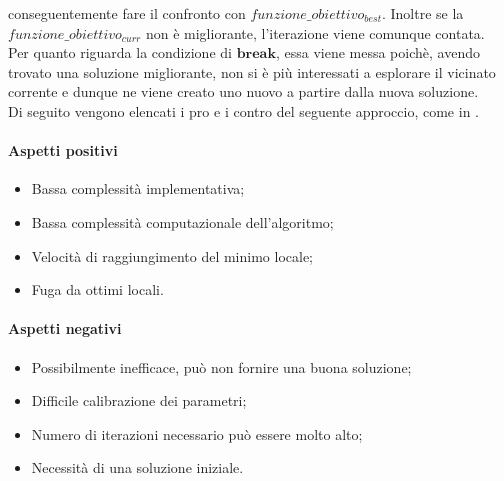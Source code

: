 conseguentemente fare il confronto con {$funzione\_obiettivo_{best}$}. Inoltre se la {$funzione\_obiettivo_{curr}$} non è migliorante, l'iterazione
viene comunque contata.\\
Per quanto riguarda la condizione di {$\textbf{break}$}, essa viene messa poichè, avendo trovato una soluzione migliorante, non si è più interessati a
esplorare il vicinato corrente e dunque ne viene creato uno nuovo a partire dalla nuova soluzione.\\
Di seguito vengono elencati i pro e i contro del seguente approccio, come in \cite{site:paper-lo-go} \cite{site:articolo-tabu-search}.\\
\noindent \paragraph{Aspetti positivi}
\begin{itemize}
    \item Bassa complessità implementativa;
    \item Bassa complessità computazionale dell'algoritmo;
    \item Velocità di raggiungimento del minimo locale;
    \item Fuga da ottimi locali.
\end{itemize}

\noindent \paragraph{Aspetti negativi}
\begin{itemize}
    \item Possibilmente inefficace, può non fornire una buona soluzione;
    \item Difficile calibrazione dei parametri;
    \item Numero di iterazioni necessario può essere molto alto;
    \item Necessità di una soluzione iniziale.
\end{itemize}
